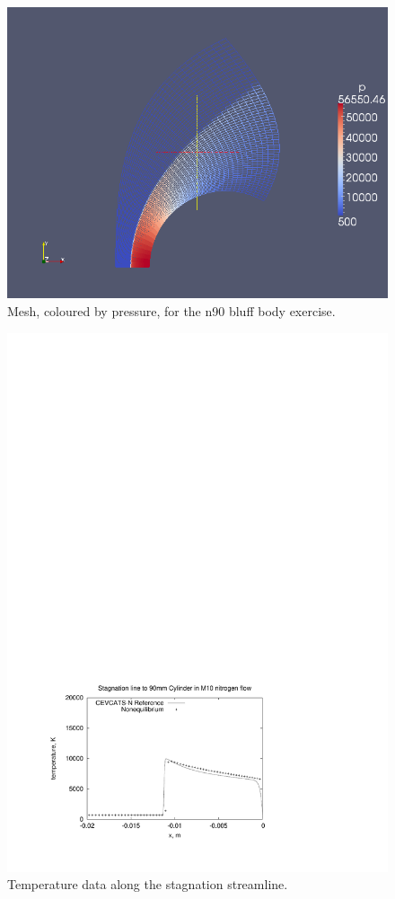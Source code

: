 \begin{figure}[htbp]
\begin{center}
\includegraphics[width=\textwidth]{../2D/n90/n90-pressure-mesh.png}
\end{center}
\caption{Mesh, coloured by pressure, for the n90 bluff body exercise.}
\label{n90-mesh-fig}
\end{figure}

\begin{figure}[htbp]
\begin{center}
\includegraphics[width=12cm, viewport=67 53 403 291]{../2D/n90/n90_compare_T_stag_line.pdf}
\end{center}
\caption{Temperature data along the stagnation streamline.}
\label{n90-stag-line-temp-fig}
\end{figure}


